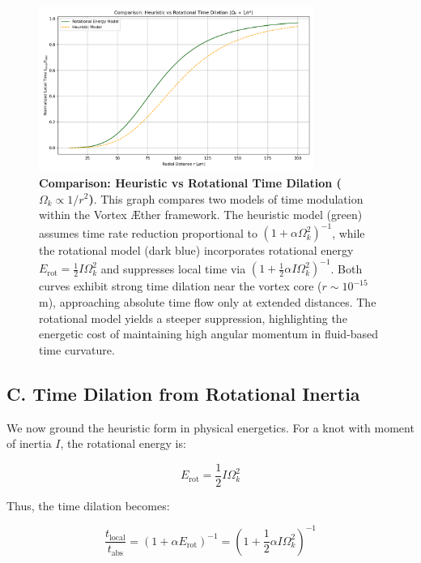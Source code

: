 \begin{figure}[h!]
    \centering
    \includegraphics[width=0.8\textwidth]{export/RotationalVsHeuristicTimeDilation}
    \caption{\textbf{Comparison: Heuristic vs Rotational Time Dilation (\(\Omega_k \propto 1/r^2\))}.
    This graph compares two models of time modulation within the Vortex Æther framework.
    The heuristic model (green) assumes time rate reduction proportional to \((1 + \alpha \Omega_k^2)^{-1}\),
        while the rotational model (dark blue) incorporates rotational energy \(E_{\text{rot}} = \frac{1}{2} I \Omega_k^2\) and suppresses local time via
        \((1 + \frac{1}{2} \alpha I \Omega_k^2)^{-1}\). Both curves exhibit strong time dilation near the vortex core (\(r \sim 10^{-15}\) m),
        approaching absolute time flow only at extended distances. The rotational model yields a steeper suppression,
        highlighting the energetic cost of maintaining high angular momentum in fluid-based time curvature.
    }
    \label{fig:radial_time_profile}
\end{figure}

\subsection*{C. Time Dilation from Rotational Inertia}

We now ground the heuristic form in physical energetics. For a knot with moment of inertia $I$, the rotational energy is:

\begin{equation}
E_{\text{rot}} = \frac{1}{2} I \Omega_k^2
\end{equation}

Thus, the time dilation becomes:

\begin{equation}
\frac{t_{\text{local}}}{t_{\text{abs}}} = \left(1 + \alpha E_{\text{rot}} \right)^{-1} = \left(1 + \frac{1}{2} \alpha I \Omega_k^2 \right)^{-1}
\end{equation}

